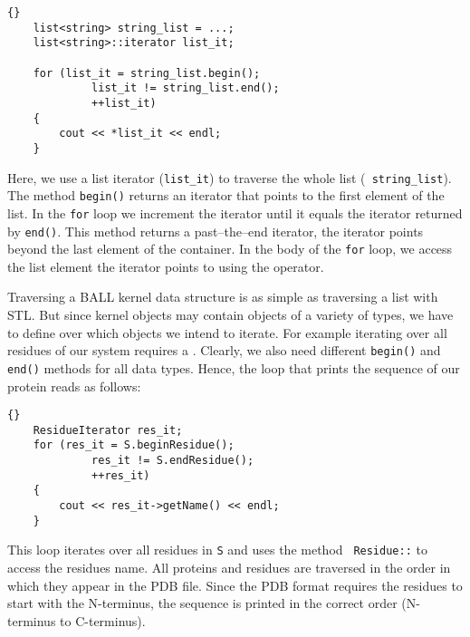 \begin{lstlisting}{}
	list<string> string_list = ...;
	list<string>::iterator list_it;
	
	for (list_it = string_list.begin(); 
			 list_it != string_list.end();
			 ++list_it)
	{
		cout << *list_it << endl;
	}
\end{lstlisting}

\noindent
Here, we use a list iterator ({\tt list\_it}) to traverse the whole list ({\tt
string\_list}). The method {\tt begin()} returns an iterator that points to
the first element of the list. In the {\tt for} loop we increment the iterator
until it equals the iterator returned by {\tt end()}. This method returns a
past--the--end iterator, \ie the iterator points beyond the last element of
the container. In the body of the {\tt for} loop, we access the list element
the iterator points to using the {\tt *} operator.

Traversing a BALL kernel data structure is as simple as traversing a list with
STL. But since kernel objects may contain objects of a variety of types,
we have to define over which objects we intend to iterate.
For example iterating over all residues of our system requires a
. Clearly, we also need different {\tt begin()} and
{\tt end()} methods for all data types. Hence, the loop that prints the
sequence of our protein reads as follows:

\begin{lstlisting}{}
	ResidueIterator res_it;
	for (res_it = S.beginResidue(); 
			 res_it != S.endResidue();
			 ++res_it)
	{
		cout << res_it->getName() << endl;
	}
\end{lstlisting}

\noindent
This loop iterates over all residues in {\tt S} and uses the method {\tt
Residue::} to access the residues name. All proteins and
residues are traversed in the order in which they appear in the PDB file.
Since the PDB format requires the residues to start with the N-terminus,
the sequence is printed  in the correct order (N-terminus to C-terminus).
